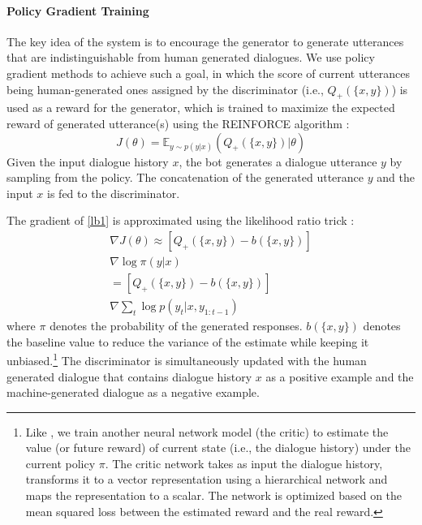 \documentclass[11pt]{article}
\begin{document}
\paragraph{Policy Gradient Training}
 The key idea of the system is to encourage the generator to generate utterances that are indistinguishable from human generated dialogues. We use policy gradient methods to achieve such a goal, in which the 
score of current utterances being human-generated ones assigned by the discriminator
(i.e.,  $Q_+(\{x,y\})$)
 is used as a reward for the generator, which is trained to maximize the expected reward of generated utterance(s) using the REINFORCE algorithm \cite{williams1992simple}:
 \begin{equation}
 J(\theta)=\mathbb{E}_{y\sim p(y|x)}(Q_+(\{x,y\})|\theta)
 \label{lb1}
 \end{equation}
Given the input dialogue history $x$, the  bot generates a dialogue utterance $y$ by sampling from the policy. 
The concatenation of the generated utterance $y$ and the input $x$ is fed to the discriminator. 
\begin{comment}
For multi-turn simulation, the second bot updates the dialogue history $x$ by adding 
the previous generated utterance, then samples another sequence $y'$  from the policy given the updated dialogue history $x$. 
The two bots take turns talking to each other (i.e.,
doing encoding and decoding) until the maximum number of simulation turns is reached. 
The discriminator then assigns a score to the entire simulated dialogue.
 \end{comment}
 The gradient of \eqref{lb1} is approximated using the likelihood ratio trick \cite{williams1992simple,glynn1990likelihood,aleksand1968stochastic}:
\begin{multline}
\nabla J(\theta)\approx [Q_+(\{x,y\})-b(\{x,y\})] \\ \nabla\log \pi(y|x)
\\ = [Q_+(\{x,y\})-b(\{x,y\})] \\ \nabla\sum_t \log p(y_t|x,y_{1:t-1})
\label{partial}
\end{multline}
where $\pi$ denotes the probability of the generated responses. 
 $b(\{x,y\})$ denotes the baseline value to reduce the variance of the estimate while keeping it unbiased.\footnote{
 Like , 
 we train another neural network model (the critic) to estimate the value (or future reward) of current state (i.e., the dialogue history) under the current policy $\pi$. The critic network takes as input the dialogue history, transforms it to a vector representation using a hierarchical network and maps the representation to a scalar. The network is optimized based on the mean squared loss between the estimated reward and the real reward.} The discriminator is simultaneously updated with the human generated dialogue that contains dialogue history $x$ as a positive example and the machine-generated dialogue as a negative example. 
\end{document}
